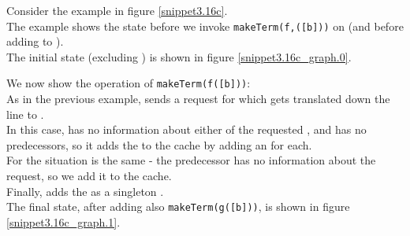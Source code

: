 \bigskip
\noindent
Consider the example in figure \ref{snippet3.16c}.\\
The example shows the state before we invoke \lstinline|makeTerm(f,([b]))| on  (and before adding  to ).\\
The initial state (excluding ) is shown in figure \ref{snippet3.16c_graph.0}.

\bigskip
\noindent
We now show the operation of \lstinline|makeTerm(f([b]))|:\\
As in the previous example,  sends a request for  which gets translated
down the line to .\\
In this case,  has no information about either of the requested \GFAs{}, and has no predecessors, so it adds the \GFAs{} to the cache by adding an \RGFA{} for each.\\
For  the situation is the same - the predecessor has no information about the request, so we add it to the cache.\\
Finally,  adds the \GFA{} as a singleton \GT{}.\\
The final state, after adding also \lstinline|makeTerm(g([b]))|, is shown in figure \ref{snippet3.16c_graph.1}.



